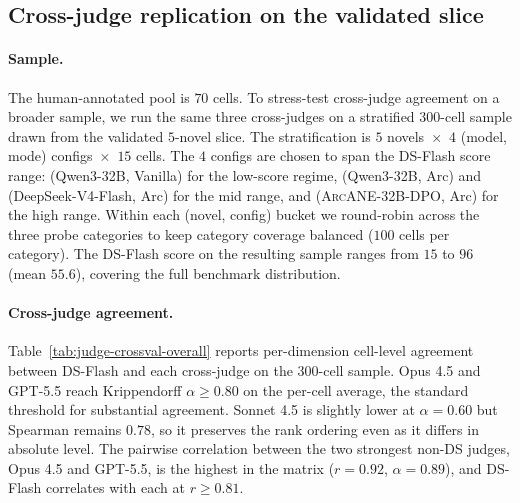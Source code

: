 \documentclass[11pt]{article}
\newcommand{\ours}{\textsc{ArcANE}}
\begin{document}
\subsection{Cross-judge replication on the validated slice\label{app:judge-crossval-cross}}

\paragraph{Sample.} The human-annotated pool is $70$ cells. To stress-test cross-judge agreement on a broader sample, we run the same three cross-judges on a stratified $300$-cell sample drawn from the validated $5$-novel slice. The stratification is $5$ novels~$\times$~$4$ (model, mode) configs~$\times$~$15$ cells. The $4$ configs are chosen to span the DS-Flash score range: (Qwen3-32B, Vanilla) for the low-score regime, (Qwen3-32B, Arc) and (DeepSeek-V4-Flash, Arc) for the mid range, and (\ours{}-32B-DPO, Arc) for the high range. Within each (novel, config) bucket we round-robin across the three probe categories to keep category coverage balanced ($100$ cells per category). The DS-Flash score on the resulting sample ranges from $15$ to $96$ (mean $55.6$), covering the full benchmark distribution.

\paragraph{Cross-judge agreement.} Table~\ref{tab:judge-crossval-overall} reports per-dimension cell-level agreement between DS-Flash and each cross-judge on the $300$-cell sample. Opus 4.5 and GPT-5.5 reach Krippendorff $\alpha{\geq}0.80$ on the per-cell average, the standard threshold for substantial agreement. Sonnet 4.5 is slightly lower at $\alpha{=}0.60$ but Spearman remains $0.78$, so it preserves the rank ordering even as it differs in absolute level. The pairwise correlation between the two strongest non-DS judges, Opus 4.5 and GPT-5.5, is the highest in the matrix ($r{=}0.92$, $\alpha{=}0.89$), and DS-Flash correlates with each at $r{\geq}0.81$.
\end{document}
